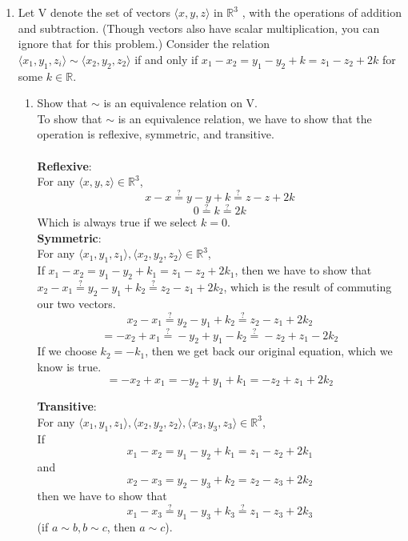 
\usepackage{amsmath, dsfont}

\oddsidemargin 0in
\evensidemargin 0in
\textwidth 6.5in
\topmargin -0.5in
\textheight 9.0in
\newcommand{\norm}[1]{\left\lVert #1 \right\rVert}
\newcommand{\?}{\stackrel{?}{=}}



\pagestyle{myheadings}


\begin{enumerate}
\item Let V denote the set of vectors $\langle x,y,z\rangle$ in $\mathds{R}^3$
, with the operations of addition and subtraction.
(Though vectors also have scalar multiplication, you can ignore that for this problem.)
Consider the relation\\
$\langle x_1, y_1, z_i\rangle \sim \langle x_2,y_2,z_2 \rangle$ if and only if $x_1-x_2 = y_1 - y_2 + k = z_1 - z_2 + 2k$ for some $k \in \mathds{R}$.

\begin{enumerate}
\item Show that $\sim$ is an equivalence relation on V.\\

To show that $\sim$ is an equivalence relation, we have to show that the operation is reflexive, symmetric, and transitive.\\\\
\textbf{Reflexive}:\\
For any $\langle x,y,z \rangle \in \mathds{R}^3$,\\
$$x-x \? y-y+k \? z-z+2k$$
$$0 \? k \? 2k$$
Which is always true if we select $k=0$.\\

\textbf{Symmetric}:\\
For any $\langle x_1,y_1,z_1 \rangle, \langle x_2,y_2,z_2 \rangle \in \mathds{R}^3$,\\
If $x_1-x_2=y_1-y_2+k_1=z_1-z_2+2k_1$, then we have to show that $x_2 - x_1 \? y_2 - y_1 + k_2 \? z_2 - z_1 + 2k_2$, which is the result of commuting our two vectors.
$$x_2 - x_1 \? y_2 - y_1 + k_2 \? z_2 - z_1 + 2k_2$$
$$= -x_2 + x_1 \? -y_2 + y_1 - k_2 \? -z_2 + z_1 - 2k_2$$
If we choose $k_2 = -k_1$, then we get back our original equation, which we know is true.
$$= -x_2 + x_1 = -y_2 + y_1 + k_1 = -z_2 + z_1 + 2k_2$$

\textbf{Transitive}:\\
For any $\langle x_1,y_1,z_1 \rangle, \langle x_2,y_2,z_2 \rangle, \langle x_3,y_3,z_3 \rangle \in \mathds{R}^3$,\\
If $$x_1-x_2=y_1-y_2+k_1=z_1-z_2+2k_1$$ and $$x_2-x_3=y_2-y_3+k_2=z_2-z_3+2k_2$$
then we have to show that
$$x_1-x_3 \? y_1-y_3+k_3 \? z_1-z_3+2k_3$$
(if $a \sim b, b \sim c$, then $a \sim c$).\\


\end{enumerate}
\end{enumerate}
